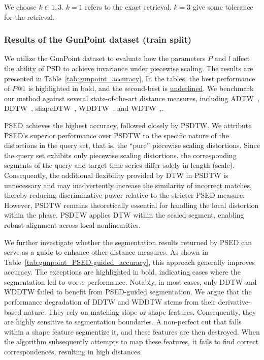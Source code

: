 We choose $k \in {1, 3}$. 
$k=1$ refers to the exact retrieval. 
$k=3$ give some tolerance for the retrieval. 

\subsubsection{Results of the GunPoint dataset (train split)} %



We utilize the GunPoint dataset to evaluate how the parameters $P$ and $l$ affect the ability of PSD to achieve invariance under piecewise scaling. 
The results are presented in Table~\ref{tab:gunpoint_accuracy}, 
In the tables, the best performance of $\overbar{P@1}$ is highlighted in bold, and the second-best is \underline{underlined}.
We benchmark our method against several state-of-the-art distance measures, including ADTW~\cite{herrmann2023amercing}, DDTW~\cite{keogh2001derivative}, shapeDTW~\cite{zhao2018shapedtw}, WDDTW~\cite{jeong2011weighted}, and WDTW~\cite{jeong2011weighted},. 

PSED achieves the highest accuracy, followed closely by PSDTW.
We attribute PSED's superior performance over PSDTW to the specific nature of the distortions in the query set, that is, the ``pure'' piecewise scaling distortions. 
Since the query set exhibits only piecewise scaling distortions, the corresponding segments of the query and target time series differ solely in length (scale). 
Consequently, the additional flexibility provided by DTW in PSDTW is unnecessary and may inadvertently increase the similarity of incorrect matches, thereby reducing discriminative power relative to the stricter PSED measure.
However, PSDTW remains theoretically essential for handling the local distortion within the phase.
PSDTW applies DTW within the scaled segment, enabling robust alignment across local nonlinearities.


\noindent{} 
We further investigate whether the segmentation results returned by PSED can serve as a guide to enhance other distance measures. 
As shown in Table~\ref{tab:gunpoint_PSED-guided_accuracy}, this approach generally improves accuracy. 
The exceptions are highlighted in bold, indicating cases where the segmentation led to worse performance. 
%
Notably, in most cases, only DDTW and WDDTW failed to benefit from PSED-guided segmentation.
We argue that the performance degradation of DDTW and WDDTW stems from their derivative-based nature. 
They rely on matching slope or shape features.
Consequently, they are highly sensitive to segmentation boundaries. 
A non-perfect cut that falls within a shape feature segmentize it, and these features are then destroyed.
When the algorithm subsequently attempts to map these features, it fails to find correct correspondences, resulting in high distances.

